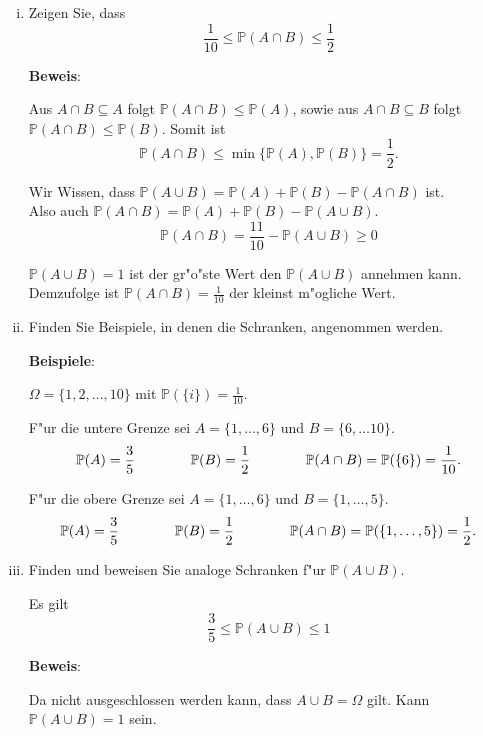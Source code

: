 \documentclass[11pt,a4paper,ngerman]{article}
\newcommand{\set}[1]{ \{ #1 \}}
\newcommand{\Prob}{\mathbb{P}}
\begin{document}
\begin{enumerate}[(i)]
  \item Zeigen Sie, dass \[
      \dfrac{1}{10} \le \Prob(A \cap B) \le \dfrac{1}{2}
    \]

    \textbf{Beweis}:

    Aus $A \cap B \subseteq A$ folgt $\Prob(A \cap B) \le \Prob(A)$, sowie aus
    $A \cap B \subseteq B$ folgt $\Prob(A \cap B) \le \Prob(B)$. Somit ist \[
      \Prob(A \cap B) \le \min\set{\Prob(A), \Prob(B)} = \dfrac{1}{2}.
    \]

    Wir Wissen, dass $\Prob(A\cup B) = \Prob(A) + \Prob(B) - \Prob(A\cap B)$ ist.\\
    Also auch $\Prob(A\cap B) = \Prob(A) + \Prob(B) - \Prob(A\cup B)$.
    \[
      \Prob(A\cap B) = \dfrac{11}{10} - \Prob(A\cup B) \ge 0
    \]

    $\Prob(A\cup B) = 1$ ist der gr"o"ste Wert den $\Prob(A\cup B)$ annehmen
    kann. Demzufolge ist $\Prob(A\cap B) = \frac{1}{10}$ der kleinst m"ogliche
    Wert.

  \item Finden Sie Beispiele, in denen die Schranken, angenommen werden.

    \textbf{Beispiele}:

    $\Omega = \set{1,2,\ldots,10}$ mit $\Prob(\set i) = \frac{1}{10}$.

    F"ur die untere Grenze sei $A = \set{1,\ldots,6}$ und
    $B = \set{6, \ldots 10}$. \[
      \Prob(A) = \dfrac{3}{5} \\ \qquad\qquad
      \Prob(B) = \dfrac{1}{2} \\ \qquad\qquad
      \Prob(A\cap B) = \Prob(\set 6) = \dfrac{1}{10}.
    \]

    F"ur die obere Grenze sei $A = \set{1,\ldots,6}$ und
    $B = \set{1,\ldots, 5}$. \[
      \Prob(A) = \dfrac{3}{5} \\ \qquad\qquad
      \Prob(B) = \dfrac{1}{2} \\ \qquad\qquad
      \Prob(A\cap B) = \Prob(\set{1,\ldots,5}) = \dfrac{1}{2}.
    \]

  \item Finden und beweisen Sie analoge Schranken f"ur $\Prob(A \cup B)$.

    Es gilt \[
      \dfrac{3}{5} \le \Prob(A \cup B) \le 1
    \]

    \textbf{Beweis}:

    Da nicht ausgeschlossen werden kann, dass $A \cup B = \Omega$ gilt. Kann
    $\Prob(A\cup B) = 1$ sein.


\end{enumerate}
\end{document}
